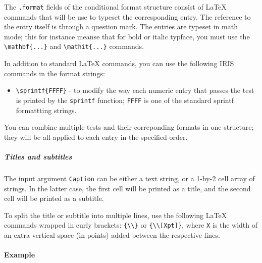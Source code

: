 The \texttt{.format} fields of the conditional format structure consist
of LaTeX commands that will be use to typeset the corresponding entry.
The reference to the entry itself is through a question mark. The
entries are typeset in math mode; this for instance meanse that for bold
or italic typface, you must use the
\texttt{\textbackslash{}mathbf\{...\}} and
\texttt{\textbackslash{}mathit\{...\}} commands.

In addition to standard LaTeX commands, you can use the following IRIS
commands in the format strings:

\begin{itemize}
\itemsep1pt\parskip0pt
\item
  \texttt{\textbackslash{}sprintf\{FFFF\}} - to modify the way each
  numeric entry that passes the test is printed by the \texttt{sprintf}
  function; \texttt{FFFF} is one of the standard sprintf formattting
  strings.
\end{itemize}

You can combine multiple tests and their correponding formats in one
structure; they will be all applied to each entry in the specified
order.

\subparagraph{Titles and subtitles}\label{titles-and-subtitles}

The input argument \texttt{Caption} can be either a text string, or a
1-by-2 cell array of strings. In the latter case, the first cell will be
printed as a title, and the second cell will be printed as a subtitle.

To split the title or subtitle into multiple lines, use the following
LaTeX commands wrapped in curly brackets:
\texttt{\{\textbackslash{}\textbackslash{}\}} or
\texttt{\{\textbackslash{}\textbackslash{}{[}Xpt{]}\}}, where \texttt{X}
is the width of an extra vertical space (in points) added between the
respective lines.

\paragraph{Example}\label{example}


